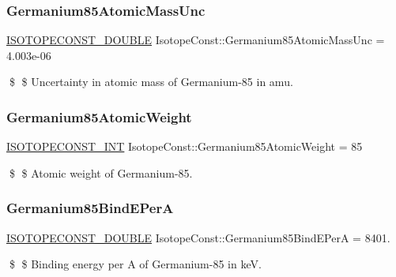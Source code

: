 \subsubsection{\texorpdfstring{Germanium85\+Atomic\+Mass\+Unc}{Germanium85AtomicMassUnc}}
{\footnotesize\ttfamily \mbox{\hyperlink{group___isotope_const-_macros_ga8f45a7272ce02c0b4c65c44636ed719a}{I\+S\+O\+T\+O\+P\+E\+C\+O\+N\+S\+T\+\_\+\+D\+O\+U\+B\+LE}} Isotope\+Const\+::\+Germanium85\+Atomic\+Mass\+Unc = 4.\+003e-\/06}

\$ \$ Uncertainty in atomic mass of Germanium-\/85 in amu. \mbox{\label{group___isotope_const-_germanium-_ge85_ga2be206872a3775c5ff9d7029dd97815c}} 
\subsubsection{\texorpdfstring{Germanium85\+Atomic\+Weight}{Germanium85AtomicWeight}}
{\footnotesize\ttfamily \mbox{\hyperlink{group___isotope_const-_macros_ga5f18360b3e99483a35c32d789e62621c}{I\+S\+O\+T\+O\+P\+E\+C\+O\+N\+S\+T\+\_\+\+I\+NT}} Isotope\+Const\+::\+Germanium85\+Atomic\+Weight = 85}

\$ \$ Atomic weight of Germanium-\/85. \mbox{\label{group___isotope_const-_germanium-_ge85_ga46dd803639c80dc767f746f0216d6b96}} 
\subsubsection{\texorpdfstring{Germanium85\+Bind\+E\+PerA}{Germanium85BindEPerA}}
{\footnotesize\ttfamily \mbox{\hyperlink{group___isotope_const-_macros_ga8f45a7272ce02c0b4c65c44636ed719a}{I\+S\+O\+T\+O\+P\+E\+C\+O\+N\+S\+T\+\_\+\+D\+O\+U\+B\+LE}} Isotope\+Const\+::\+Germanium85\+Bind\+E\+PerA = 8401.}

\$ \$ Binding energy per A of Germanium-\/85 in keV. \mbox{\label{group___isotope_const-_germanium-_ge85_gac27653b4b1fe98067e446925c8d26bb1}} 
